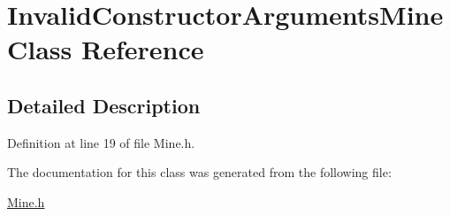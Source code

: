 \hypertarget{class_invalid_constructor_arguments_mine}{\section{Invalid\+Constructor\+Arguments\+Mine Class Reference}
\label{class_invalid_constructor_arguments_mine}
}


\subsection{Detailed Description}


Definition at line 19 of file Mine.\+h.



The documentation for this class was generated from the following file\+:\begin{DoxyCompactItemize}
\item 
\hyperlink{_mine_8h}{Mine.\+h}\end{DoxyCompactItemize}
